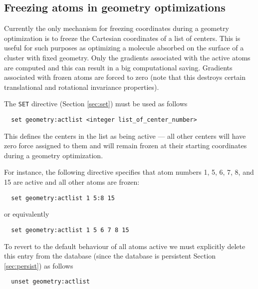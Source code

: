 \subsection{Freezing atoms in geometry optimizations}
\label{sec:activeatoms}

Currently the only mechanism for freezing coordinates during a
geometry optimization is to freeze the Cartesian coordinates of a list
of centers.  This is useful for such purposes as optimizing a molecule
absorbed on the surface of a cluster with fixed geometry.  Only the
gradients associated with the active atoms are computed and this can
result in a big computational saving.  Gradients associated with
frozen atoms are forced to zero (note that this destroys certain
translational and rotational invariance properties).

The \verb+SET+ directive (Section \ref{sec:set}) must be used as
follows
\begin{verbatim}
  set geometry:actlist <integer list_of_center_number>
\end{verbatim}
This defines the centers in the list as being active --- all other
centers will have zero force assigned to them and will remain frozen
at their starting coordinates during a geometry optimization.

For instance, the following directive specifies that atom numbers 1,
5, 6, 7, 8, and 15 are active and all other atoms are frozen:
\begin{verbatim}
  set geometry:actlist 1 5:8 15
\end{verbatim}
or equivalently
\begin{verbatim}
  set geometry:actlist 1 5 6 7 8 15
\end{verbatim}


To revert to the default behaviour of all atoms active we
must explicitly delete this entry from the database (since
the database is persistent Section \ref{sec:persist}) as follows
\begin{verbatim}
  unset geometry:actlist
\end{verbatim}




